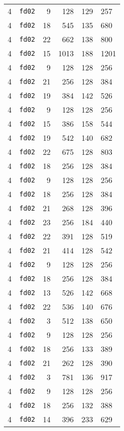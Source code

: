 \documentclass{article}
\begin{document}
\begin{table}[h!]
\begin{tabular}{llrrrl}
    4 & \texttt{fd02} & 9 & 128 & 129 & 257 \\
    4 & \texttt{fd02} & 18 & 545 & 135 & 680 \\
    4 & \texttt{fd02} & 22 & 662 & 138 & 800 \\
    4 & \texttt{fd02} & 15 & 1013 & 188 & 1201 \\
    4 & \texttt{fd02} & 9 & 128 & 128 & 256 \\
    4 & \texttt{fd02} & 21 & 256 & 128 & 384 \\
    4 & \texttt{fd02} & 19 & 384 & 142 & 526 \\
    4 & \texttt{fd02} & 9 & 128 & 128 & 256 \\
    4 & \texttt{fd02} & 15 & 386 & 158 & 544 \\
    4 & \texttt{fd02} & 19 & 542 & 140 & 682 \\
    4 & \texttt{fd02} & 22 & 675 & 128 & 803 \\
    4 & \texttt{fd02} & 18 & 256 & 128 & 384 \\
    4 & \texttt{fd02} & 9 & 128 & 128 & 256 \\
    4 & \texttt{fd02} & 18 & 256 & 128 & 384 \\
    4 & \texttt{fd02} & 21 & 268 & 128 & 396 \\
    4 & \texttt{fd02} & 23 & 256 & 184 & 440 \\
    4 & \texttt{fd02} & 22 & 391 & 128 & 519 \\
    4 & \texttt{fd02} & 21 & 414 & 128 & 542 \\
    4 & \texttt{fd02} & 9 & 128 & 128 & 256 \\
    4 & \texttt{fd02} & 18 & 256 & 128 & 384 \\
    4 & \texttt{fd02} & 13 & 526 & 142 & 668 \\
    4 & \texttt{fd02} & 22 & 536 & 140 & 676 \\
    4 & \texttt{fd02} & 3 & 512 & 138 & 650 \\
    4 & \texttt{fd02} & 9 & 128 & 128 & 256 \\
    4 & \texttt{fd02} & 18 & 256 & 133 & 389 \\
    4 & \texttt{fd02} & 21 & 262 & 128 & 390 \\
    4 & \texttt{fd02} & 3 & 781 & 136 & 917 \\
    4 & \texttt{fd02} & 9 & 128 & 128 & 256 \\
    4 & \texttt{fd02} & 18 & 256 & 132 & 388 \\
    4 & \texttt{fd02} & 14 & 396 & 233 & 629 \\

\end{tabular}
\end{table}
\end{document}
